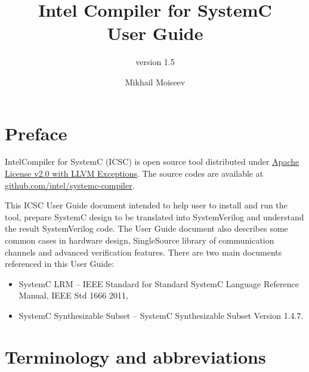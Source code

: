 



 
\title[Intel Compiler for SystemC User Guide]{Intel Compiler for SystemC \\ User Guide}
\subtitle{version 1.5}

\author{Mikhail Moiseev}
\ifdefined\INTEL
{}
\else
{}
\fi


\maketitle
\pagebreak

\setcounter{tocdepth}{2}
\tableofcontents


\pagebreak

\section{Preface}

Intel\textregistered Compiler for SystemC (ICSC) is open source tool distributed under \href{https://github.com/intel/systemc-compiler/blob/main/LICENSE.txt}{Apache License v2.0 with LLVM Exceptions}. The source codes are available at \href{https://github.com/intel/systemc-compiler}{github.com/intel/systemc-compiler}.

This ICSC User Guide document intended to help user to install and run the tool, prepare SystemC design to be translated into SystemVerilog and understand the result SystemVerilog code. The User Guide document also describes some common cases in hardware design, SingleSource library of communication channels and advanced verification features.
%
There are two main documents referenced in this User Guide: 
\begin{itemize}
\item SystemC LRM -- IEEE Standard for Standard SystemC Language Reference Manual, IEEE Std 1666 2011,
\item SystemC Synthesizable Subset -- SystemC Synthesizable Subset Version 1.4.7. 
\end{itemize}

\section{Terminology and abbreviations}

